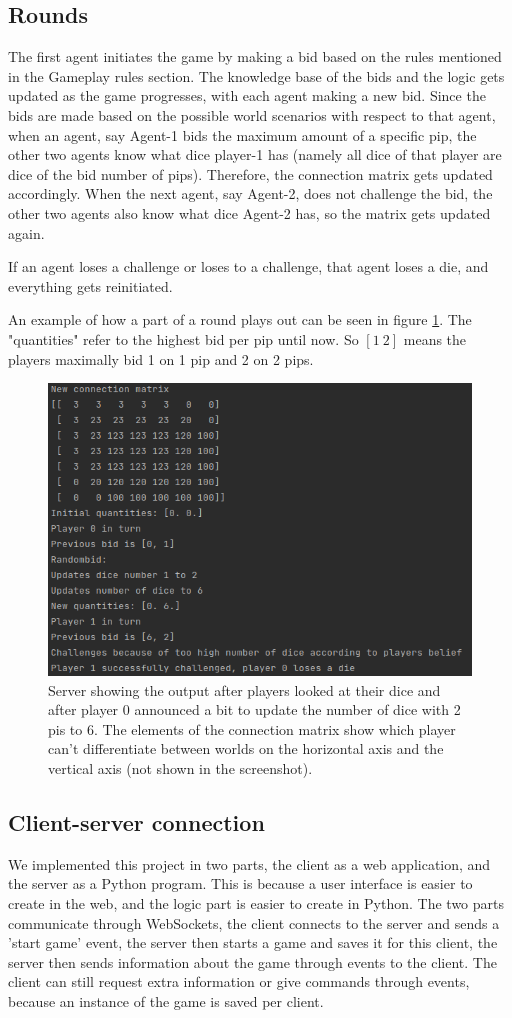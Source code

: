 \documentclass{article}
\begin{document}
\subsection*{Rounds}
The first agent initiates the game by making a bid based on the rules mentioned in the Gameplay rules section. The knowledge base of the bids and the logic gets updated as the game progresses, with each agent making a new bid.  Since the bids are made based on the possible world scenarios with respect to that agent, when an agent, say Agent-1 bids the maximum amount of a specific pip, the other two agents know what dice player-1 has (namely all dice of that player are dice of the bid number of pips). Therefore, the connection matrix gets updated accordingly. When the next agent, say Agent-2, does not challenge the bid, the other two agents also know what dice Agent-2 has, so the matrix gets updated again.

If an agent loses a challenge or loses to a challenge, that agent loses a die, and everything gets reinitiated.


An example of how a part of a round plays out can be seen in figure \ref{fig:halfaround}. The "quantities" refer to the highest bid per pip until now. So $[1\ 2]$ means the players maximally bid 1 on 1 pip and 2 on 2 pips.
\begin{figure}[h!]
    \centering
    \includegraphics[width=.6\textwidth]{img/gameplay.png}
    \caption{Server showing the output after players looked at their dice and after player 0 announced a bit to update the number of dice with 2 pis to 6. The elements of the connection matrix show which player can't differentiate between worlds on the horizontal axis and the vertical axis (not shown in the screenshot).}
    \label{fig:halfaround}
\end{figure}

\subsection*{Client-server connection} %
We implemented this project in two parts, the client as a web application, and the server as a Python program. This is because a user interface is easier to create in the web, and the logic part is easier to create in Python. The two parts communicate through WebSockets, the client connects to the server and sends a 'start game' event, the server then starts a game and saves it for this client, the server then sends information about the game through events to the client. The client can still request extra information or give commands through events, because an instance of the game is saved per client. 
\end{document}
